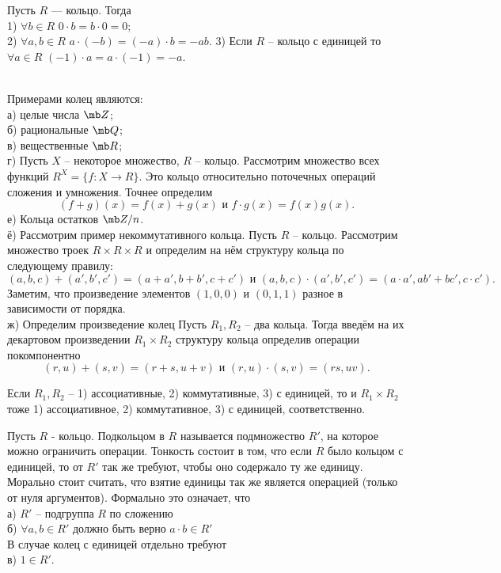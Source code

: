  Пусть $R$ — кольцо. Тогда \\
1) $\forall b \in R$  $0\cdot b = b\cdot 0 = 0$;\\
2) $\forall a,b \in R$  $a\cdot(-b) = (-a)\cdot b = -ab$.
3) Если $R$ -- кольцо с единицей то $\forall a \in R$  $(-1)\cdot a = a\cdot (-1) = -a$.
\elm





\exm \\
Примерами колец являются:\\
а) целые числа $\mb Z$;\\
б) рациональные $\mb Q$;\\
в) вещественные $\mb R$;\\
г) Пусть $X$ – некоторое множество, $R$ – кольцо. Рассмотрим множество всех функций $R^X=\{f\colon X \to R\}$. Это кольцо относительно поточечных операций сложения и умножения. Точнее определим 
$$(f+g)(x)=f(x)+g(x) \text{ и } f\cdot g(x)=f(x)g(x).$$
е) Кольца остатков $\mb Z/n$.\\
ё) Рассмотрим пример некоммутативного кольца. Пусть $R$ -- кольцо. Рассмотрим множество троек $R\times R\times R$ и определим на нём структуру кольца по следующему правилу:
$$(a,b,c) + (a',b',c')=(a+a',b+b',c+c') \text{ и } (a,b,c) \cdot (a',b',c')=(a\cdot a',ab'+bc',c\cdot c').$$
Заметим, что произведение элементов $(1,0,0)$ и $(0,1,1)$ разное в зависимости от порядка.\\
ж) Определим произведение колец
\dfn Пусть $R_1, R_2$ -- два кольца. Тогда введём на  их декартовом произведении $R_1\times R_2$ структуру кольца определив операции покомпонентно 
$$(r,u)+(s,v)=(r+s,u+v) \text{ и } (r,u)\cdot(s,v)=(rs, uv).$$
\edfn

\rm
Если $R_1,R_2$ -- 1) ассоциативные, 2) коммутативные, 3) с единицей, то и $R_1\times R_2$  тоже 1) ассоциативное, 2) коммутативное, 3) с единицей, соответственно.
\erm

\dfn[Подкольцо] Пусть $R$ - кольцо. Подкольцом в $R$ называется подмножество $R'$, на которое можно
ограничить операции. Тонкость состоит в том, что если $R$ было кольцом с единицей, то от $R'$ так же требуют, чтобы оно содержало ту же единицу. Морально стоит считать, что взятие единицы так же является операцией (только от нуля аргументов).
Формально это означает, что\\
а) $R'$ -- подгруппа $R$ по сложению\\
б) $\forall a,b\in R'$ должно быть верно $a\cdot b \in R'$ \\
В случае колец с единицей отдельно требуют\\
в) $1\in R'$.
\edfn



